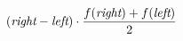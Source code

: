 \documentclass[11pt]{article}
\begin{document}
\[
(\mbox{\it right} - \mbox{\it left}) 
\cdot 
\frac{f (\mbox{\it right}) + f (\mbox{\it left})}
     {2}
\]
\end{document}
